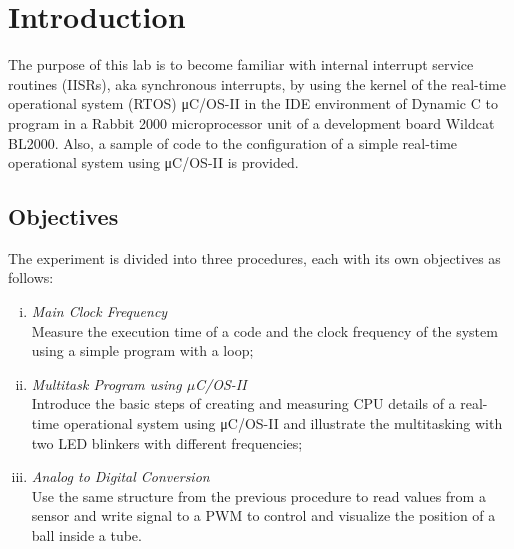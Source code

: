 \section{Introduction}

The purpose of this lab is to become familiar with internal interrupt service routines (IISRs), aka synchronous interrupts, by using the kernel of the real-time operational system (RTOS) μC/OS-II in the IDE environment of Dynamic C to program in a Rabbit 2000 microprocessor unit of a development board Wildcat BL2000. Also, a sample of code to the configuration of a simple real-time operational system using μC/OS-II is provided.

\subsection{Objectives}
The experiment is divided into three procedures, each with its own objectives as follows:

\begin{enumerate}[(i)]

\item
\textit{Main Clock Frequency}
\\Measure the execution time of a code and the clock frequency of the system using a simple program with a loop;

\item
\textit{Multitask Program using $μ$C/OS-II}
\\Introduce the basic steps of creating and measuring CPU details of a real-time operational system using μC/OS-II and illustrate the multitasking with two LED blinkers with different frequencies;

\item
\textit{Analog to Digital Conversion}
\\Use the same structure from the previous procedure to read values from a sensor and write signal to a PWM to control and visualize the position of a ball inside a tube.

\end{enumerate}

\begin{lstlisting}[frame=single]
\end{lstlisting}